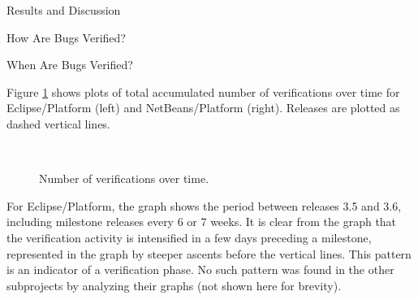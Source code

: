 \begin{section}{Results and Discussion}
\begin{subsection}{How Are Bugs Verified?}
	
\end{subsection}

\begin{subsection}{When Are Bugs Verified?}
	

	Figure \ref{fig:when} shows plots of total accumulated number of verifications over time for Eclipse/Platform (left) and NetBeans/Platform (right). Releases are plotted as dashed vertical lines.	

\begin{figure}
\centering
\mbox{
{}}
\caption{Number of verifications over time.} \label{fig:when}
\end{figure}


	For Eclipse/Platform, the graph shows the period between releases 3.5 and 3.6, including milestone releases every 6 or 7 weeks. It is clear from the graph that the verification activity is intensified in a few days preceding a milestone, represented in the graph by steeper ascents before the vertical lines. This pattern is an indicator of a verification phase. No such pattern was found in the other subprojects by analyzing their graphs (not shown here for brevity).


\end{subsection}
\end{section}
